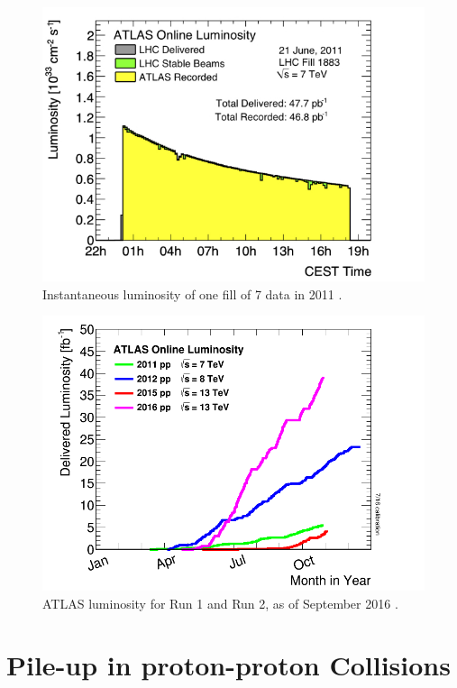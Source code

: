 \begin{centering}
\begin{figure}[!hbt]
\myfloatalign
\includegraphics[width=.90\linewidth]{figures/lhc/lumi1883.jpg}
\caption{Instantaneous luminosity of one fill of 7 \tev data in 2011 \cite{lumi}.}
\label{fig:instlumi}
\end{figure}
\end{centering}

\begin{centering}
\begin{figure}[!hbt]
\myfloatalign
\includegraphics[width=.90\linewidth]{figures/lhc/intlumivsyear.png}
\caption{\ac{ATLAS} luminosity for Run 1 and Run 2, as of September 2016 \cite{lumi2}.}
\label{fig:lumi_vs_year}
\end{figure} 
\end{centering}

\section{Pile-up in proton-proton Collisions}
\label{sec:pileup}

